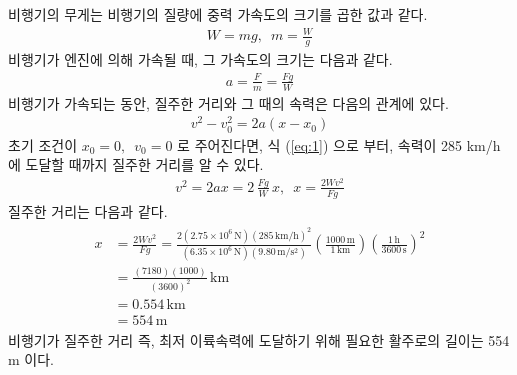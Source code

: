 \documentclass[floatfix,nofootinbib,superscriptaddress,fleqn,preprint]{revtex4}
\begin{document}
 비행기의 무게는 비행기의 질량에 중력 가속도의 크기를
곱한 값과 같다.
\begin{align}
  W=mg,\,\,\,m=\frac{W}{g}
\end{align}
비행기가 엔진에 의해 가속될 때, 그 가속도의 크기는 다음과 같다.
\begin{align}
  a=\frac{F}{m}=\frac{Fg}{W}
\end{align}
비행기가 가속되는 동안, 질주한 거리와 그 때의 속력은 
다음의 관계에 있다.
\begin{align}\label{eq:1}
 v^2-v^2_0 = 2a(x-x_0) 
\end{align}
초기 조건이 $x_0=0,\,\,\,v_0=0$ 로 주어진다면, 식 (\ref{eq:1}) 으로
부터, 속력이 285 km/h 에 도달할 때까지 질주한 거리를 알 수 있다.
\begin{align}
    v^2 = 2ax = 2\,\frac{Fg}{W}\,x,\,\,\,
    x=\frac{2Wv^2}{Fg}
\end{align}
질주한 거리는 다음과 같다.
\begin{align}
  \begin{split}
    x&=\frac{2Wv^2}{Fg}
    =\frac{2(2.75\times 10^6\,\mathrm{N}){(285\,\mathrm{km/h})}^2}
    {(6.35\times 10^6\,\mathrm{N})(9.80\,\mathrm{m/s^2})}
    \left(\frac{1000\,\mathrm{m}}{1\,\mathrm{km}}\right)
    \left(\frac{1\,\mathrm{h}}{3600\,\mathrm{s}}\right)^2 \\
    &=\frac{(7180)(1000)}{(3600)^2}\,\mathrm{km}  \\
    &=0.554\,\mathrm{km} \\
    &= 554\,\mathrm{m}
  \end{split}
\end{align}
비행기가 질주한 거리 즉, 최저 이륙속력에 도달하기 위해 필요한 
활주로의 길이는 554 m 이다.

\vspace{2cm}
\end{document}
